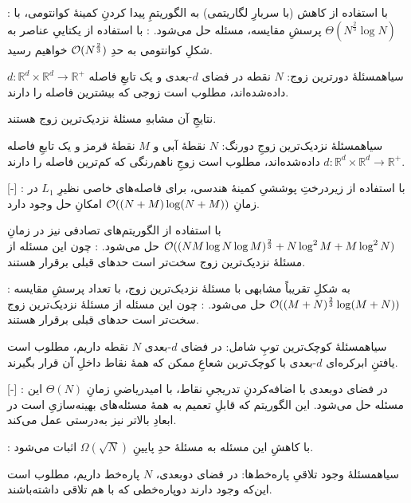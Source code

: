 : با استفاده از کاهش (با سربارِ لگاریتمی) به الگوریتمِ پیدا کردنِ کمینهٔ کوانتومی، با
$\Theta(N^{\frac{2}{3}} \log N)$
پرسشِ مقایسه، مسئله حل می‌شود.
: با استفاده از یکتاییِ عناصر به شکلِ کوانتومی به حدِ
$\mathcal{O}(N^{\frac{2}{3}})$
خواهیم رسید.


‌سیاه{مسئلهٔ دورترین زوج}: 
\(N\)
نقطه در فضای \(d\)-بعدی و یک تابعِ فاصله 
\(d: \mathbb{R}^d \times \mathbb{R}^d \to \mathbb{R}^+\)
داده‌شده‌اند، مطلوب است زوجی که بیشترین فاصله را دارند.
 
نتایجِ آن مشابهِ مسئلهٔ نزدیک‌ترین زوج هستند.

‌سیاه{مسئلهٔ نزدیک‌ترین زوجِ دورنگ}: 
$N$
نقطهٔ آبی و $M$ نقطهٔ قرمز و یک تابعِ فاصله 
\(d: \mathbb{R}^d \times \mathbb{R}^d \to \mathbb{R}^+\)
داده‌شده‌اند، مطلوب است زوجِ ناهم‌رنگی که کم‌ترین فاصله را دارند. \cite[]{kao}

[-]
: با استفاده از زیردرختِ پوششیِ کمینهٔ هندسی، برای فاصله‌های خاصی نظیرِ $L_1$ در زمانِ 
$\mathcal{O}((N+M) \log (N+M))$
 امکانِ حل وجود دارد.

با استفاده از الگوریتم‌های تصادفی نیز در زمانِ
$\mathcal{O}((NM \log N\log M)^\frac{2}{3}+N\log^2M+M\log^2N)$
حل می‌شود.
: چون این مسئله از مسئلهٔ نزدیک‌ترین زوج سخت‌تر است حدهای قبلی برقرار هستند.

: به شکلِ تقریباً مشابهی با مسئلهٔ نزدیک‌ترین زوج، با تعداد پرسشِ مقایسه
$\mathcal{O}((M+N)^{\frac{2}{3}} \log (M+N))$
حل می‌شود.
: چون این مسئله از مسئلهٔ نزدیک‌ترین زوج سخت‌تر است حدهای قبلی برقرار هستند.


‌سیاه{مسئلهٔ کوچک‌ترین توپِ شامل}: در فضای $d$-بعدی $N$ نقطه داریم، مطلوب است یافتنِ ابرکره‌ای $d$-بعدی با کوچک‌ترین شعاعِ ممکن که همهٔ نقاط داخلِ آن قرار بگیرند.

[-]
: در فضای دوبعدی با اضافه‌کردنِ تدریجیِ نقاط، با امیدریاضیِ زمانِ
$\Theta(N)$
این مسئله حل می‌شود. این الگوریتم که قابلِ تعمیم به همهٔ مسئله‌های بهینه‌سازیِ 
است در ابعادِ بالاتر نیز به‌درستی عمل می‌کند.

: با کاهشِ این مسئله به مسئلهٔ 
حدِ پایینِ
$\Omega(\sqrt{N})$
اثبات می‌شود.


‌سیاه{مسئلهٔ وجود تلاقیِ پاره‌خط‌ها}: در فضای دوبعدی، $N$ پاره‌خط داریم، مطلوب است این‌که وجود دارند دوپاره‌خطی که با هم تلاقی داشته‌باشند.

